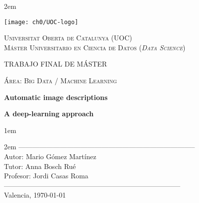 \newpage
\thispagestyle{empty}

\baselineskip 2em


\centerline{\texttt{[image: ch0/UOC-logo]}}
\begin{center}
\textsc{Universitat Oberta de Catalunya (UOC) \\
 Máster Universitario en Ciencia de Datos (\textit{Data Science})\\}


\vspace*{1.5cm}

\textsc{\Large TRABAJO FINAL DE MÁSTER}

\vspace*{0.5cm}

\textsc{\large Área: Big Data / Machine Learning}



\vspace*{2.0cm}

\textbf{\Large Automatic image descriptions}

\textbf{\large A deep-learning approach}

\vspace{2.5cm}
\baselineskip 1em

\baselineskip 2em
-----------------------------------------------------------------------------\\
Autor:      Mario Gómez Martínez\\
Tutor:      Anna Bosch Rué\\
Profesor:   Jordi Casas Roma\\
-----------------------------------------------------------------------------\\
\vspace*{1.5cm}
Valencia, \today

\end{center}

\newpage
\pagestyle{empty}
\hfill

